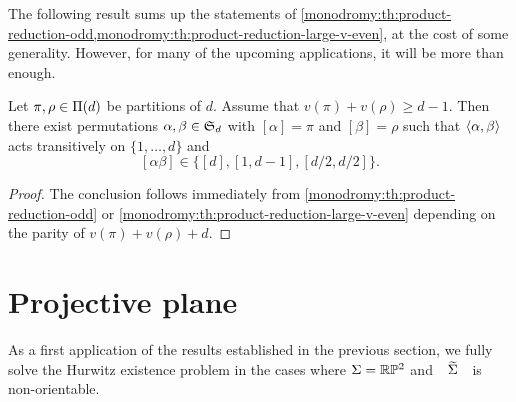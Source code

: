 The following result sums up the statements of \cref{monodromy:th:product-reduction-odd,monodromy:th:product-reduction-large-v-even}, at the cost of some generality. However, for many of the upcoming applications, it will be more than enough.

\begin{corollary}\label{monodromy:th:product-reduction-large-v}
Let $\pi,\rho\in\Pi(d)$ be partitions of $d$. Assume that $v(\pi)+v(\rho)\ge d-1$. Then there exist permutations $\alpha,\beta\in\symgroup[d]$ with $[\alpha]=\pi$ and $[\beta]=\rho$ such that $\left\langle\alpha,\beta\right\rangle$ acts transitively on $\{1,\ldots,d\}$ and
\[
[\alpha\beta]\in\{[d],[1,d-1],[d/2,d/2]\}.
\]
\end{corollary}
\begin{proof}
The conclusion follows immediately from \cref{monodromy:th:product-reduction-odd} or \cref{monodromy:th:product-reduction-large-v-even} depending on the parity of $v(\pi)+v(\rho)+d$.
\end{proof}

\section{Projective plane}

As a first application of the results established in the previous section, we fully solve the Hurwitz existence problem in the cases where $\Sigma=\RP[2]$ and $\tSigma$ is non-orientable.

